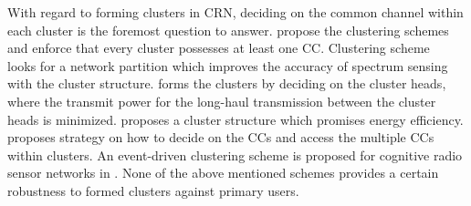 \documentclass[times]{ettauth}
\theoremstyle{mytheoremstyle}
\theoremstyle{mytheoremstyle}
\theoremstyle{mytheoremstyle}
\begin{document}
With regard to forming clusters in CRN, deciding on the common channel within each cluster is the foremost question to answer.
\cite{Zhao07, Chen07,Affinity_clustering_09icccn} propose the clustering schemes and enforce that every cluster possesses at least one CC.
Clustering scheme~\cite{Consensus_based_clustering12} looks for a network partition which improves the accuracy of spectrum sensing with the cluster structure.
\cite{TWC2012_cooperative_communication} forms the clusters by deciding on the cluster heads, where the transmit power for the long-haul transmission between the cluster heads is minimized.
\cite{clustering_globecom11} proposes a cluster structure which promises energy efficiency.
\cite{cluster_EW10} proposes strategy on how to decide on the CCs and access the multiple CCs within clusters.
An event-driven clustering scheme is proposed for cognitive radio sensor networks in \cite{Ozger_cluster_crsn_13}.
None of the above mentioned schemes provides a certain robustness to formed clusters against primary users. 
\end{document}
